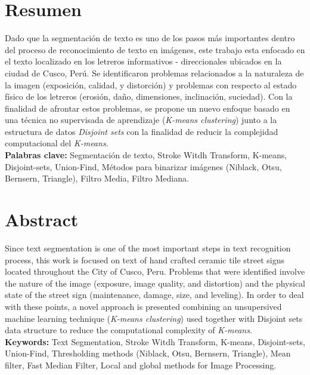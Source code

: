 \documentclass[12pt,oneside,a4paper]{book}
\theoremstyle{definition}
\begin{document}
\chapter*{Resumen}

Dado que la segmentación de texto es uno de los pasos más importantes dentro 
del proceso de reconocimiento de texto en imágenes, este trabajo esta enfocado
en el texto localizado en los letreros informativos - direccionales ubicados 
en la ciudad de Cusco, Perú. Se identificaron problemas relacionados a la 
naturaleza de la imagen (exposición, calidad, y distorción) y problemas con 
respecto al estado físico de los letreros (erosión, daño, dimensiones, 
inclinación, suciedad). Con la finalidad de afrontar estos problemas, se 
propone un nuevo enfoque basado en una técnica no supervisada de aprendizaje 
(\textit{K-means clustering}) junto a la estructura de datos \textit{Disjoint 
sets} con la finalidad de reducir la complejidad computacional del 
\textit{K-means}.
\\

\noindent \textbf{Palabras clave:} Segmentación de texto, Stroke Witdh 
Transform, K-means, Disjoint-sets, Union-Find, Métodos para binarizar imágenes
(Niblack, Otsu, Bernsern, Triangle), Filtro Media, Filtro Mediana.

\chapter*{Abstract}

Since text segmentation is one of the most important steps in text recognition
process, this work is focused on text of hand crafted ceramic tile street 
signs located throughout the City of Cusco, Peru. Problems that were 
identified involve the nature of the image (exposure, image quality, and 
distortion) and the physical state of the street sign (maintenance, damage, 
size, and leveling). In order to deal with these points, a novel approach is 
presented combining an unsupersived machine learning technique 
(\textit{K-means clustering}) used together with Disjoint sets data structure 
to reduce the computational complexity of \textit{K-means}.
\\

\noindent \textbf{Keywords:} Text Segmentation, Stroke Witdh Transform, 
K-means, Disjoint-sets, Union-Find, Thresholding methods (Niblack, Otsu, 
Bernsern, Triangle), Mean filter, Fast Median Filter, Local and global 
methods for Image Processing.
\end{document}
